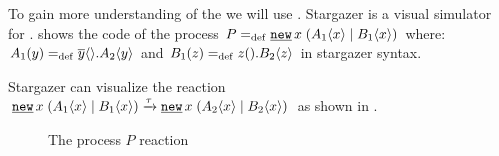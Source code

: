 To gain more understanding of the \picalc{} we will use \cite{stargazer}. Stargazer is a visual simulator for \picalc{}.  shows the code of the process $P\define\procres{x}{(\procpar{\proccall{A_1}{x}}{\proccall{B_1}{x}})}$ where: $A_1(y)=_{\mathrm{def}}{}\overline{y}\langle{}\rangle.A_2\langle y\rangle$ and $B_1(z)=_{\mathrm{def}}{}z({}).B_2\langle z\rangle$ in stargazer syntax.

\raggedbottom

Stargazer can visualize the reaction $\procres{x}{(\procpar{\proccall{A_1}{x}}{\proccall{B_1}{x}})} \transs{\tau} \procres{x}{(\procpar{\proccall{A_2}{x}}{\proccall{B_2}{x}})}$ as shown in
.

\begin{figure}[H]%
\centering
{}%
\hfill
{}%
\caption{The process $P$ reaction}
\label{pi_visualization_stargazer_reaction}%
\end{figure}